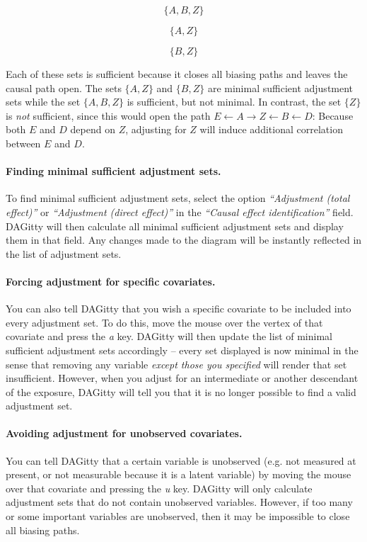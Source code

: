 \documentclass[a4paper]{article} %
\newcommand{\pp}{{\sc DAG}itty\xspace}
\newcommand{\action}[1]{\emph{``#1''}}
\begin{document}
$$ \{A,B,Z\} $$

$$ \{A,Z\} $$

$$ \{B,Z\} $$ 

Each of these sets is sufficient because it closes all biasing paths and leaves 
the causal path open. The sets $\{A,Z\}$ and $\{B,Z\}$ are minimal sufficient adjustment 
sets while the set $\{A,B,Z\}$ is sufficient, but not minimal. 
In contrast, the set $\{Z\}$ is \emph{not} sufficient, since this would 
open  
the path $E \leftarrow A \rightarrow Z \leftarrow B \leftarrow D$: 
Because both $E$ and 
$D$ depend on $Z$, adjusting for $Z$ will induce 
additional correlation between $E$ and $D$. 

\paragraph{Finding minimal sufficient adjustment sets.}

To find minimal sufficient adjustment sets, select the 
option \action{Adjustment (total effect)}
or \action{Adjustment (direct effect)} in the 
\action{Causal effect identification} field. 
\pp
will then calculate all minimal sufficient adjustment sets and display 
them in that field. Any changes made to the diagram will be instantly
reflected in the list of adjustment sets.

\paragraph{Forcing adjustment for specific covariates.}

You can also tell \pp that you wish a specific covariate
to be included into every adjustment set. To do this, move the
mouse over the vertex of that covariate and press the \emph{a} 
key. \pp will then update the list of minimal sufficient
adjustment sets accordingly -- every set displayed
is now minimal in the sense that removing any variable 
\emph{except those you specified} will render
that set insufficient. However, when you adjust for an intermediate
or another descendant of the exposure, \pp will tell you that it is no longer
possible to find a valid adjustment set.

\paragraph{Avoiding adjustment for unobserved covariates.}

You can tell \pp that a certain variable is unobserved 
(e.g. not measured at present, or not measurable because it is a 
latent variable) by moving the mouse 
over that covariate and pressing the \emph{u} key.
\pp will only calculate adjustment sets that do 
not contain unobserved variables. However, if too many or
some important variables are unobserved, then it may
be impossible to close all biasing paths. 
\end{document}
